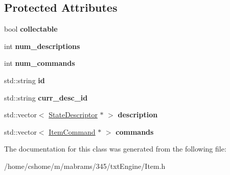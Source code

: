 \subsection*{Protected Attributes}
\begin{DoxyCompactItemize}
\item 
\hypertarget{class_item_a6bdb6d40e682e1cac093a786cb51d1d1}{
bool {\bfseries collectable}}
\label{class_item_a6bdb6d40e682e1cac093a786cb51d1d1}

\item 
\hypertarget{class_item_a0bedf3dd3801688ca197958b4ed82cd7}{
int {\bfseries num\_\-descriptions}}
\label{class_item_a0bedf3dd3801688ca197958b4ed82cd7}

\item 
\hypertarget{class_item_ac9e4624443be051800792a7f37014373}{
int {\bfseries num\_\-commands}}
\label{class_item_ac9e4624443be051800792a7f37014373}

\item 
\hypertarget{class_item_a1c8acc0ec062f69ccc65faf2a3a44bdb}{
std::string {\bfseries id}}
\label{class_item_a1c8acc0ec062f69ccc65faf2a3a44bdb}

\item 
\hypertarget{class_item_a3c36a19c6fae89b169cc1acf555532dd}{
std::string {\bfseries curr\_\-desc\_\-id}}
\label{class_item_a3c36a19c6fae89b169cc1acf555532dd}

\item 
\hypertarget{class_item_ab27e598cd37ca13b26c40d929d85400d}{
std::vector$<$ \hyperlink{class_state_descriptor}{StateDescriptor} $\ast$ $>$ {\bfseries description}}
\label{class_item_ab27e598cd37ca13b26c40d929d85400d}

\item 
\hypertarget{class_item_add7e6704ad626679f70ff8f2ae76698c}{
std::vector$<$ \hyperlink{class_item_command}{ItemCommand} $\ast$ $>$ {\bfseries commands}}
\label{class_item_add7e6704ad626679f70ff8f2ae76698c}

\end{DoxyCompactItemize}


The documentation for this class was generated from the following file:\begin{DoxyCompactItemize}
\item 
/home/cshome/m/mabrams/345/txtEngine/Item.h\end{DoxyCompactItemize}

